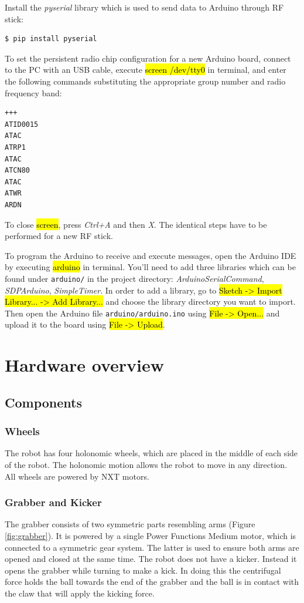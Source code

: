 \documentclass[a4paper,12pt]{article}
\newcommand{\hg}[1]{\hl{\ttfamily #1}}
\begin{document}
Install the \textit{pyserial} library which is used to send data to Arduino through RF stick:
\begin{lstlisting}
$ pip install pyserial
\end{lstlisting}

To set the persistent radio chip configuration for a new Arduino board, connect to the PC with an USB cable, execute \hg{screen /dev/tty0} in terminal, and enter the following commands substituting the appropriate group number and radio frequency band:

\begin{lstlisting}
+++
ATID0015
ATAC
ATRP1
ATAC
ATCN80
ATAC
ATWR
ARDN
\end{lstlisting}

To close \hg{screen}, press \textit{Ctrl+A} and then \textit{X}. The identical steps have to be performed for a new RF stick.

To program the Arduino to receive and execute messages, open the Arduino IDE by executing \hg{arduino} in terminal. You'll need to add three libraries which can be found under \texttt{arduino/} in the project directory: \textit{ArduinoSerialCommand}, \textit{SDPArduino}, \textit{SimpleTimer}. In order to add a library, go to
\hg{Sketch -> Import Library... -> Add Library...} and choose the library directory you want to import. Then open the Arduino file \texttt{arduino/arduino.ino} using \hg{File -> Open...} and upload it to the board using \hg{File -> Upload}.

\section{Hardware overview}

\subsection{Components}
\subsubsection{Wheels}
The robot has four holonomic wheels, which are placed in the middle of each side of the robot. The holonomic motion allows the robot to move in any direction. All wheels are powered by NXT motors.
\subsubsection{Grabber and Kicker}
The grabber consists of two symmetric parts resembling arms (Figure \ref{fig:grabber}). It is powered by a single Power Functions Medium motor, which is connected to a symmetric gear system. The latter is used to ensure both arms are opened and closed at the same time. The robot does not have a kicker. Instead it opens the grabber while turning to make a kick. In doing this the centrifugal force holds the ball towards the end of the grabber and the ball is in contact with the claw that will apply the kicking force.
\end{document}

